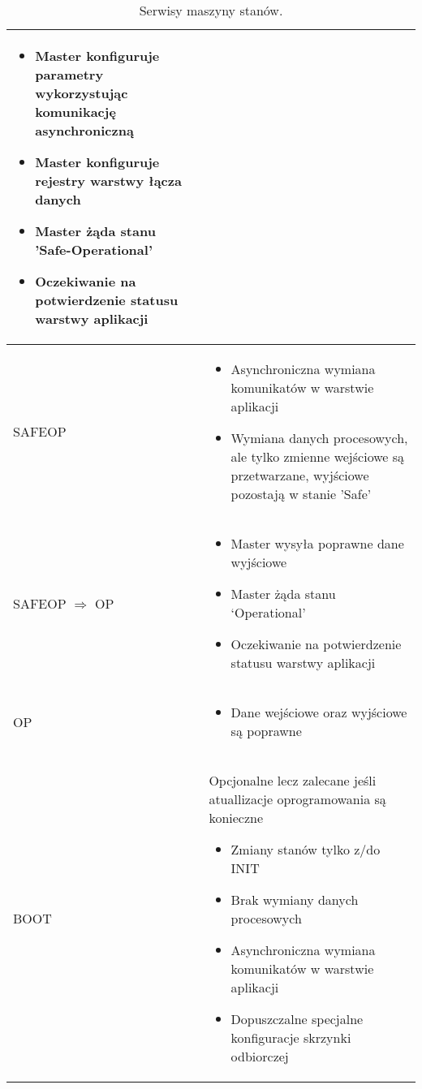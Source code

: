 \begin{table}[!htb]
\begin{center}
\begin{tabular}{| p{} | p{} |}
\begin{itemize}
\item Master konfiguruje parametry wykorzystując komunikację asynchroniczną
\item Master konfiguruje rejestry warstwy łącza danych
\item Master żąda stanu 'Safe-Operational'
\item Oczekiwanie na potwierdzenie statusu warstwy aplikacji
\end{itemize}\\\hline
SAFEOP & \begin{itemize}
\item Asynchroniczna wymiana komunikatów w warstwie aplikacji
\item Wymiana danych procesowych, ale tylko zmienne wejściowe są przetwarzane, wyjściowe pozostają w stanie 'Safe'
\end{itemize}\\\hline
SAFEOP $\Rightarrow$ OP & \begin{itemize} \setlength{\itemsep}{0pt} \setlength{\parskip}{0pt} \setlength{\parsep}{0pt} \setlength{\topsep}{0pt}
\item Master wysyła poprawne dane wyjściowe
\item Master żąda stanu ‘Operational’
\item Oczekiwanie na potwierdzenie statusu warstwy aplikacji
\end{itemize}\\\hline
OP & \begin{itemize} \setlength{\itemsep}{0pt} \setlength{\parskip}{0pt} \setlength{\parsep}{0pt} \setlength{\topsep}{0pt}
\item Dane wejściowe oraz wyjściowe są poprawne
\end{itemize}\\\hline
BOOT & Opcjonalne lecz zalecane jeśli atuallizacje oprogramowania są konieczne\begin{itemize} \setlength{\itemsep}{0pt} \setlength{\parskip}{0pt} \setlength{\parsep}{0pt} \setlength{\topsep}{0pt}
\item Zmiany stanów tylko z/do INIT
\item Brak wymiany danych procesowych
\item Asynchroniczna wymiana komunikatów w warstwie aplikacji
\item Dopuszczalne specjalne konfiguracje skrzynki odbiorczej
\end{itemize}\\\hline
\end{tabular}
\end{center}
\vspace*{-6mm}
  \caption{Serwisy maszyny stanów.}
	\label{etherCAT:state_machine_services}
\end{table}